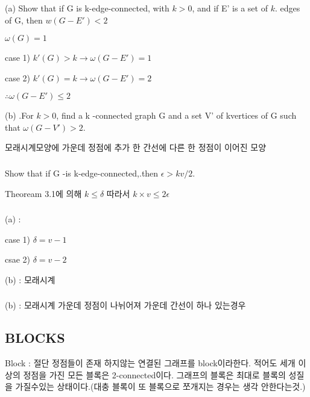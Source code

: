 \begin{theorem}
    
\end{theorem}

\subsubsection{}
(a) Show that if G is k-edge-connected, with $k >0$, and if E' is a set
of $k$. edges of G, then $w(G - E') < 2$

$\omega(G) = 1$

case 1) $k'(G) > k  \rightarrow \omega(G-E') = 1$

case 2) $k'(G) = k  \rightarrow \omega(G-E') = 2$

$ \therefore \omega(G-E') \le 2$


(b) .For $k > 0$, find a k -connected graph G and a set V' of kvertices
of G such that $\omega(G - V') > 2.$

모래시계모양에 가운데 정점에 추가 한 간선에 다른 한 정점이 이어진 모양 

\subsubsection{}
Show that if G -is k-edge-connected,.then $\epsilon > kv/2.$

Theoream 3.1에 의해 $k \le \delta$ 따라서 $k \times v \le 2\epsilon$

\subsubsection{}
(a)  : 

case 1) $\delta = v - 1$ 

csae 2) $\delta = v - 2$ 

(b) : 모래시계

\subsubsection{}
(b) : 모래시계 가운데 정점이 나뉘어져 가운데 간선이 하나 있는경우


\subsubsection{}





\subsection{BLOCKS}

\begin{dfn}[Blocks]
    Block : 절단 정점들이 존재 하지않는 연결된 그래프를 block이라한다.
    적어도 세개 이상의 정점을 가진 모든 블록은 2-connected이다.
    그래프의 블록은 최대로 블록의 성질을 가질수있는 상태이다.(대충 블록이 또 블록으로 쪼개지는 경우는 생각 안한다는것.)
\end{dfn}

\begin{theorem}
    
\end{theorem}




